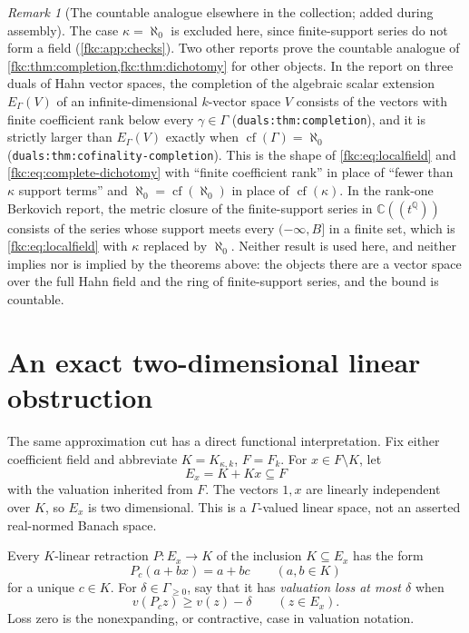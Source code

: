 \documentclass[11pt,letterpaper]{article}
\numberwithin{equation}{section}
\theoremstyle{definition}
\theoremstyle{remark}
\newtheorem{remark}[theorem]{Remark}
\newcommand{\C}{\mathbb C}
\newcommand{\Q}{\mathbb Q}
\newcommand{\cf}{\operatorname{cf}}
\newcommand{\K}{K_{\kappa,k}}
\begin{document}
\begin{remark}[The countable analogue elsewhere in the collection; added during assembly]\label{fkc:rem:countable-analogue}
The case $\kappa=\aleph_0$ is excluded here, since finite-support series do not form a field (\cref{fkc:app:checks}). Two other reports prove the countable analogue of \cref{fkc:thm:completion,fkc:thm:dichotomy} for other objects. In the report on three duals of Hahn vector spaces, the completion of the algebraic scalar extension $E_\Gamma(V)$ of an infinite-dimensional $k$-vector space $V$ consists of the vectors with finite coefficient rank below every $\gamma\in\Gamma$ (\texttt{duals:thm:completion}), and it is strictly larger than $E_\Gamma(V)$ exactly when $\cf(\Gamma)=\aleph_0$ (\texttt{duals:thm:cofinality-completion}). This is the shape of \eqref{fkc:eq:localfield} and \eqref{fkc:eq:complete-dichotomy} with ``finite coefficient rank'' in place of ``fewer than $\kappa$ support terms'' and $\aleph_0=\cf(\aleph_0)$ in place of $\cf(\kappa)$. In the rank-one Berkovich report, the metric closure of the finite-support series in $\C((t^\Q))$ consists of the series whose support meets every $(-\infty,B]$ in a finite set, which is \eqref{fkc:eq:localfield} with $\kappa$ replaced by $\aleph_0$. Neither result is used here, and neither implies nor is implied by the theorems above: the objects there are a vector space over the full Hahn field and the ring of finite-support series, and the bound is countable.
\end{remark}

\section{An exact two-dimensional linear obstruction}
\label{fkc:sec:linear}

The same approximation cut has a direct functional interpretation. Fix either coefficient field and abbreviate $K=\K$, $F=F_k$. For $x\in F\setminus K$, let
\[
 E_x=K+Kx\subseteq F
\]
with the valuation inherited from $F$. The vectors $1,x$ are linearly independent over $K$, so $E_x$ is two dimensional. This is a $\Gamma$-valued linear space, not an asserted real-normed Banach space.

Every $K$-linear retraction $P:E_x\to K$ of the inclusion $K\subseteq E_x$ has the form
\begin{equation}\label{fkc:eq:Pc}
 P_c(a+bx)=a+bc\qquad(a,b\in K)
\end{equation}
for a unique $c\in K$. For $\delta\in\Gamma_{\ge0}$, say that it has \emph{valuation loss at most $\delta$} when
\begin{equation}\label{fkc:eq:loss}
 v(P_cz)\ge v(z)-\delta\qquad(z\in E_x).
\end{equation}
Loss zero is the nonexpanding, or contractive, case in valuation notation.
\end{document}
